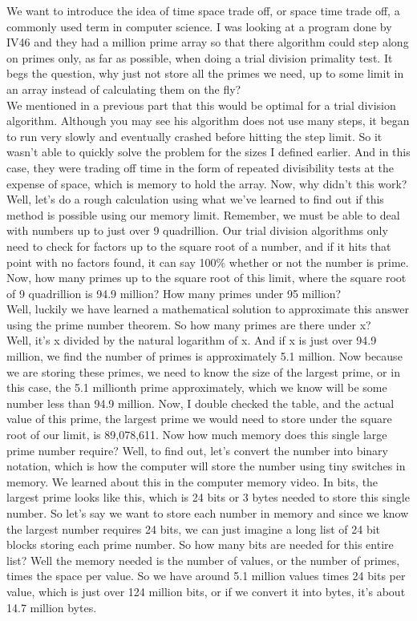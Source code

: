 \documentclass{report}
\begin{document}
We want to introduce the idea of time space trade off, or space time trade off, a commonly used term in computer science. I was looking at a program done by IV46 and they had a million prime array so that there algorithm could step along on primes only, as far as possible, when doing a trial division primality test. It begs the question, why just not store all the primes we need, up to some limit in an array instead of calculating them on the fly?\\
We mentioned in a previous part that this would be optimal for a trial division algorithm. Although you may see his algorithm does not use many steps, it began to run very slowly and eventually crashed before hitting the step limit. So it wasn't able to quickly solve the problem for the sizes I defined earlier. And in this case, they were trading off time in the form of repeated divisibility tests at the expense of space, which is memory to hold the array. Now, why didn't this work? Well, let's do a rough calculation using what we've learned to find out if this method is possible using our memory limit. Remember, we must be able to deal with numbers up to just over 9 quadrillion. Our trial division algorithms only need to check for factors up to the square root of a number, and if it hits that point with no factors found, it can say 100\% whether or not the number is prime. Now, how many primes up to the square root of this limit, where the square root of 9 quadrillion is 94.9 million? How many primes under 95 million?\\
Well, luckily we have learned a mathematical solution to approximate this answer using the prime number theorem. So how many primes are there under x?\\
Well, it's x divided by the natural logarithm of x. And if x is just over 94.9 million, we find the number of primes is approximately 5.1 million. Now because we are storing these primes, we need to know the size of the largest prime, or in this case, the 5.1 millionth prime approximately, which we know will be some number less than 94.9 million. Now, I double checked the table, and the actual value of this prime, the largest prime we would need to store under the square root of our limit, is 89,078,611. Now how much memory does this single large prime number require? Well, to find out, let's convert the number into binary notation, which is how the computer will store the number using tiny switches in memory. We learned about this in the computer memory video. In bits, the largest prime looks like this, which is 24 bits or 3 bytes needed to store this single number. So let's say we want to store each number in memory and since we know the largest number requires 24 bits, we can just imagine a long list of 24 bit blocks storing each prime number. So how many bits are needed for this entire list? Well the memory needed is the number of values, or the number of primes, times the space per value. So we have around 5.1 million values times 24 bits per value, which is just over 124 million bits, or if we convert it into bytes, it's about 14.7 million bytes.
\end{document}

